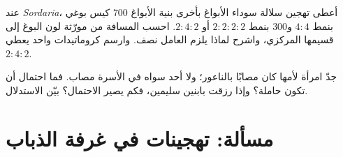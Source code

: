 \begin{exercise}[$\star\star\star$]\label{exo:b2:meiosis-heredity:11}
عند \emph{Sordaria}، أعطى تهجين سلالة سوداء الأبواغ بأخرى بنية
الأبواغ $700$ كيس بوغي بنمط $4 : 4$ و$300$ بنمط
$2 : 2 : 2 : 2$ أو $2 : 4 : 2$. احسب المسافة من مورّثة لون البوغ
إلى قسيمها المركزي، واشرح لماذا يلزم العامل نصف. وارسم كروماتيدات
 واحد يعطي $2 : 4 : 2$.
\end{exercise}

\begin{exercise}[$\star\star\star$]\label{exo:b2:meiosis-heredity:12}
جدّ امرأة لأمها كان مصابًا بالناعور؛ ولا أحد سواه في الأسرة مصاب.
فما احتمال أن تكون حاملة؟ وإذا رزقت بابنين سليمين، فكم يصير
الاحتمال؟ بيّن الاستدلال.
\end{exercise}

\section{مسألة: تهجينات في غرفة الذباب}

